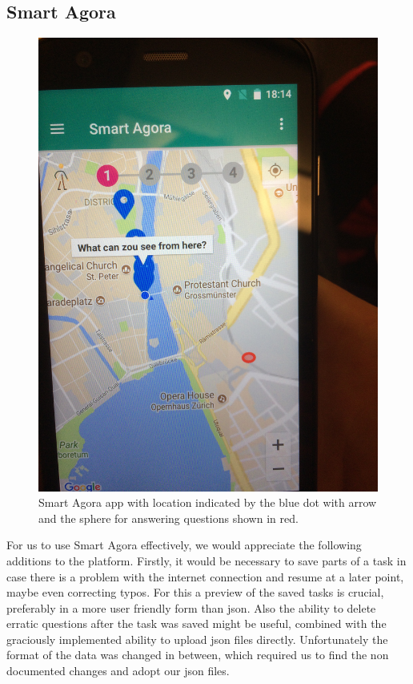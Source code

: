 \documentclass[letterpaper]{article}
\begin{document}
\subsection{Smart Agora}
\begin{figure}[htb]
    \centering
    \includegraphics[width=\columnwidth, rotate=270]{../images/SmartAgora/img_6.jpg}
    \caption{Smart Agora app with location indicated by the blue dot with arrow and the sphere for answering questions shown in red.}
    \label{fig:smart_agora_1}
\end{figure}
For us to use Smart Agora effectively, we would appreciate the following additions to the platform. Firstly, it would be necessary to save parts of a task in case there is a problem with the internet connection and resume at a later point, maybe even correcting typos. For this a preview of the saved tasks is crucial, preferably in a more user friendly form than json. Also the ability to delete erratic questions after the task was saved might be useful, combined with the graciously implemented ability to upload json files directly. Unfortunately the format of the data was changed in between, which required us to find the non documented changes and adopt our json files.\\
\end{document}
